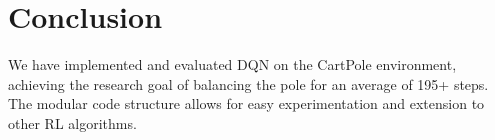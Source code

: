 \documentclass{article}
\begin{document}
\section{Conclusion}

We have implemented and evaluated DQN on the CartPole environment, achieving the research goal of balancing the pole for an average of 195+ steps. The modular code structure allows for easy experimentation and extension to other RL algorithms.



\end{document}

